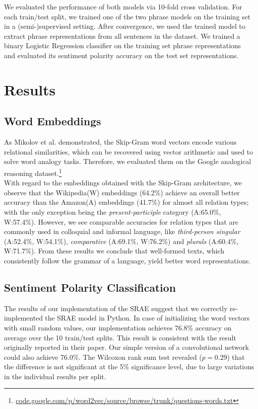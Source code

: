 \documentclass{llncs}
\begin{document}
We evaluated the performance of both models via 10-fold cross validation. For each train/test split, we trained one of the two phrase models on the training set in a (semi-)supervised setting. After convergence, we used the trained model to extract phrase  representations from all sentences in the dataset. We trained a binary Logistic Regression classifier on the training set phrase representations and evaluated its sentiment polarity accuracy on the test set representations. 

\section{Results}
\subsection{Word Embeddings}
As Mikolov et al.\cite{mikolov:efficient} demonstrated, the Skip-Gram word vectors encode various relational similarities, which can be recovered using vector arithmetic and used to solve word analogy tasks. Therefore, we evaluated them on the Google analogical reasoning dataset.\footnote{\url{code.google.com/p/word2vec/source/browse/trunk/questions-words.txt}}\\
With regard to the embeddings obtained with the Skip-Gram architecture, we observe that the Wikipedia(W) embeddings (64.2\%) achieve an overall better accuracy than the Amazon(A) embeddings (41.7\%) for almost all relation types; with the only exception being the \emph{present-participle} category (A:65.0\%, W:57.4\%). However, we see comparable accuracies for relation types that are commonly used in colloquial and informal language, like \emph{third-person singular} (A:52.4\%, W:54.1\%), \emph{comparative} (A:69.1\%, W:76.2\%) and \emph{plurals} (A:60.4\%, W:71.7\%). From these results we conclude that well-formed texts, which consistently follow the grammar of a language, yield better word representations.

\subsection{Sentiment Polarity Classification}
\label{sec:exppol}
The results of our implementation of the SRAE suggest that we correctly re-implemented the SRAE model in Python. In case of initializing the word vectors with small random values, our implementation achieves 76.8\% accuracy on average over the 10 train/test splits. This result is consistent with the result originally reported in their paper. Our simple version of a convolutional network could also achieve 76.0\%. The Wilcoxon rank sum test revealed ($p=0.29$) that the difference is not significant at the 5\% significance level, due to large variations in the individual results per split. 
\end{document}
